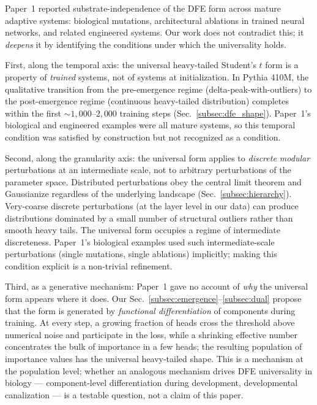 \documentclass{article}
\begin{document}
Paper~1 reported substrate-independence of the DFE form across mature adaptive systems: biological mutations, architectural ablations in trained neural networks, and related engineered systems. Our work does not contradict this; it \emph{deepens} it by identifying the conditions under which the universality holds.

First, along the temporal axis: the universal heavy-tailed Student's $t$ form is a property of \emph{trained} systems, not of systems at initialization. In Pythia 410M, the qualitative transition from the pre-emergence regime (delta-peak-with-outliers) to the post-emergence regime (continuous heavy-tailed distribution) completes within the first $\sim\!1{,}000$--$2{,}000$ training steps (Sec.~\ref{subsec:dfe_shape}). Paper~1's biological and engineered examples were all mature systems, so this temporal condition was satisfied by construction but not recognized as a condition.

Second, along the granularity axis: the universal form applies to \emph{discrete modular} perturbations at an intermediate scale, not to arbitrary perturbations of the parameter space. Distributed perturbations obey the central limit theorem and Gaussianize regardless of the underlying landscape (Sec.~\ref{subsec:hierarchy}). Very-coarse discrete perturbations (at the layer level in our data) can produce distributions dominated by a small number of structural outliers rather than smooth heavy tails. The universal form occupies a regime of intermediate discreteness. Paper~1's biological examples used such intermediate-scale perturbations (single mutations, single ablations) implicitly; making this condition explicit is a non-trivial refinement.

Third, as a generative mechanism: Paper~1 gave no account of \emph{why} the universal form appears where it does. Our Sec.~\ref{subsec:emergence}--\ref{subsec:dual} propose that the form is generated by \emph{functional differentiation} of components during training. At every step, a growing fraction of heads cross the threshold above numerical noise and participate in the loss, while a shrinking effective number concentrates the bulk of importance in a few heads; the resulting population of importance values has the universal heavy-tailed shape. This is a mechanism at the population level; whether an analogous mechanism drives DFE universality in biology --- component-level differentiation during development, developmental canalization --- is a testable question, not a claim of this paper.
\end{document}
